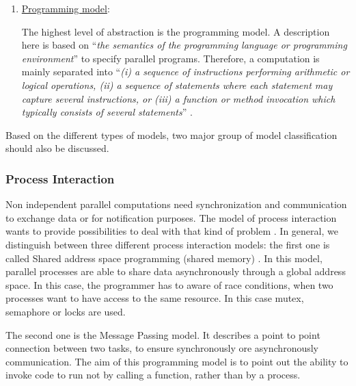 {{\begin{enumerate}
	The model of computation is based on cost functions and a more formal model of a ``\textit{corresponding architectural model}'' \parencite[see][p106]{book1}. It also takes execution time along side with the providing of resources regarding to an architectural model into account \parencite{book1}. Analytical methods for designing and evaluating algorithms are also part of this model to quantify proper computations as we already mentioned in Chapter \ref{chap:mathComp}.
	
	\newpage
	
	\item \underline{Programming model}:
	
	The highest level of abstraction is the programming model.
	A description here is based on ``\textit{the semantics of the programming language or programming environment}'' \parencite[see][p106]{book1} to specify parallel programs. Therefore, a computation is mainly separated into ``\textit{(i) a sequence of instructions performing arithmetic or logical operations, (ii) a sequence of statements where each statement may capture several instructions, or (iii) a function or method invocation which typically consists of several statements}'' \parencite[see][p106]{book1}.
\end{enumerate}

\noindent Based on the different types of models, two major group of model classification should also be discussed.

\subsubsection{Process Interaction}

Non independent parallel computations need synchronization and communication to exchange data or for notification purposes. The model of process interaction wants to provide possibilities to deal with that kind of problem \parencite[see][p4]{internet1}. In general, we distinguish between three different process interaction models: the first one is called Shared address space programming (shared memory) \parencite{internet1}. In this model, parallel processes are able to share data asynchronously through a global address space. In this case, the programmer has to aware of race conditions, when two processes want to have access to the same resource. In this case mutex, semaphore or locks are used.

The second one is the Message Passing model. It describes a point to point connection between two tasks, to ensure synchronously ore asynchronously communication. The aim of this programming model is to point out the ability to invoke code to run not by calling a function, rather than by a process.

}}
